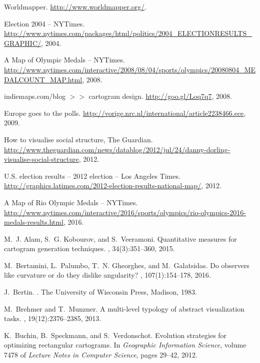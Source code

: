\documentclass[10pt,journal,compsoc]{IEEEtran}
\begin{document}
\begin{thebibliography}{10}

Worldmapper.
\newblock \url{http://www.worldmapper.org/}.

{Election} 2004 -- {NYTimes}.
\newblock
  \url{http://www.nytimes.com/packages/html/politics/2004_ELECTIONRESULTS_GRAPHIC/},
  2004.

{A Map of Olympic Medals -- NYTimes}.
\newblock
  \url{http://www.nytimes.com/interactive/2008/08/04/sports/olympics/20080804_MEDALCOUNT_MAP.html},
  2008.

indiemaps.com/blog $>>$ cartogram design.
\newblock \url{http://goo.gl/Loq7q7}, 2008.

Europe goes to the polls.
\newblock \url{http://vorige.nrc.nl/international/article2238466.ece}, 2009.

How to visualise social structure, {The Guardian}.
\newblock
  \url{http://www.theguardian.com/news/datablog/2012/jul/24/danny-dorling-visualise-social-structure},
  2012.

{U.S.} election results -- 2012 election -- {Los Angeles Times}.
\newblock
  \url{http://graphics.latimes.com/2012-election-results-national-map/}, 2012.

{A Map of Rio Olympic Medals -- NYTimes}.
\newblock
  \url{http://www.nytimes.com/interactive/2016/sports/olympics/rio-olympics-2016-medals-results.html},
  2016.

M.~J. Alam, S.~G. Kobourov, and S.~Veeramoni.
\newblock Quantitative measures for cartogram generation techniques.
, 34(3):351--360, 2015.

M.~Bertamini, L.~Palumbo, T.~N. Gheorghes, and M.~Galatsidas.
\newblock Do observers like curvature or do they dislike angularity?
, 107(1):154--178, 2016.

J.~Bertin.
.
\newblock The University of Wisconsin Press, Madison, 1983.

M.~Brehmer and T.~Munzner.
\newblock A multi-level typology of abstract visualization tasks.
,
  19(12):2376--2385, 2013.

K.~Buchin, B.~Speckmann, and S.~Verdonschot.
\newblock Evolution strategies for optimizing rectangular cartograms.
\newblock In {\em Geographic Information Science}, volume 7478 of {\em Lecture
  Notes in Computer Science}, pages 29--42, 2012.


\end{thebibliography}
\end{document}
